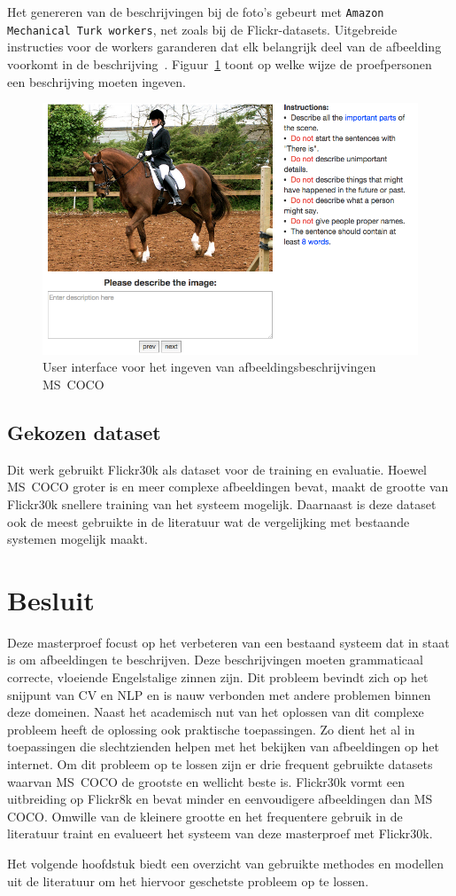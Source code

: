 Het genereren van de beschrijvingen bij de foto's gebeurt met \texttt{Amazon Mechanical Turk workers}, net zoals bij de Flickr-datasets. Uitgebreide instructies voor de workers garanderen dat elk belangrijk deel van de afbeelding voorkomt in de beschrijving~\cite{Rampf2015}. Figuur~\ref{fig:coco_ui} toont op welke wijze de proefpersonen een beschrijving moeten ingeven.

\begin{figure}[tb]
	\centering
	\includegraphics[width=0.8\linewidth]{Images/coco_UI.png}
	\caption[User interface voor het ingeven van afbeeldingsbeschrijvingen \mbox{MS COCO}]{User interface voor het ingeven van afbeeldingsbeschrijvingen \mbox{MS COCO}~\cite{Rampf2015}}
	\label{fig:coco_ui}
\end{figure}
\subsection{Gekozen dataset}
Dit werk gebruikt Flickr30k als dataset voor de training en evaluatie. Hoewel \mbox{MS COCO} groter is en meer complexe afbeeldingen bevat, maakt de grootte van Flickr30k snellere training van het systeem mogelijk. Daarnaast is deze dataset ook de meest gebruikte in de literatuur wat de vergelijking met bestaande systemen mogelijk maakt. 

\section{Besluit}
Deze masterproef focust op het verbeteren van een bestaand systeem dat in staat is om afbeeldingen te beschrijven. Deze beschrijvingen moeten grammaticaal correcte, vloeiende Engelstalige zinnen zijn. Dit probleem bevindt zich op het snijpunt van CV en NLP en is nauw verbonden met andere problemen binnen deze domeinen. Naast het academisch nut van het oplossen van dit complexe probleem heeft de oplossing ook praktische toepassingen. Zo dient het al in toepassingen die slechtzienden helpen met het bekijken van afbeeldingen op het internet. Om dit probleem op te lossen zijn er drie frequent gebruikte datasets waarvan \mbox{MS COCO} de grootste en wellicht beste is. Flickr30k vormt een uitbreiding op Flickr8k en bevat minder en eenvoudigere afbeeldingen dan MS COCO. Omwille van de kleinere grootte en het frequentere gebruik in de literatuur traint en evalueert het systeem van deze masterproef met Flickr30k. 

Het volgende hoofdstuk biedt een overzicht van gebruikte methodes en modellen uit de literatuur om het hiervoor geschetste probleem op te lossen.
